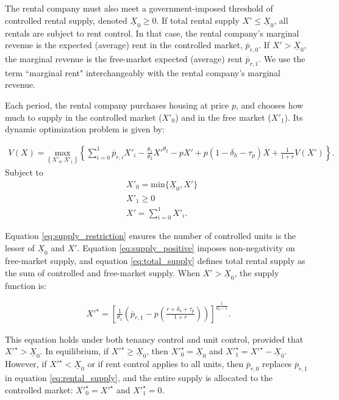 \documentclass[parskip=full]{article}
\begin{document}
The rental company must also meet a government-imposed threshold of controlled rental supply, denoted $\underline{X}_{0} \geq 0$. If total rental supply $X'\le\underline{X}_{0}$, all rentals are subject to rent control. In that case, the rental company's marginal revenue is the expected (average) rent in the controlled market, $\overline{p}_{r,0}$. If $X'>\underline{X}_{0}$, the marginal revenue is the free-market expected (average) rent $\overline{p}_{r,1}$. We use the term ``marginal rent" interchangeably with the rental company's marginal revenue.

Each period, the rental company purchases housing at price $p$, and chooses how much to supply in the controlled market ($X'_{0}$) and in the free market ($X'_{1}$). Its dynamic optimization problem is given by:

\begin{align}\label{eq:rental_company_problem}
V(X)=\underset{\left\{X'_{0},X'_{1}\right\}} {\text{$\mbox{max} $}}\left\{\sum_{i=0}^{1} \overline{p}_{r,i}X'_{i}-\frac{\theta_{1}}{\theta_{2}}X'^{\theta_{2}}-p X'+p(1-\delta_{h}-\tau_{p})X+\frac{1}{1+r}V(X')\right\}.
\end{align}
Subject to
\begin{align}
& X'_{0}=\mbox{min}\{\underline{X}_{0},X'\} \label{eq:supply_restriction} \\
& X'_{1} \geq 0 \label{eq:supply_positive} \\
& X'=\sum^{1}_{i=0} X'_{i}. \label{eq:total_supply} 
\end{align}

\noindent Equation \eqref{eq:supply_restriction} ensures the number of controlled units is the lesser of $\underline{X}_{0}$ and $X'$. Equation \eqref{eq:supply_positive} imposes non-negativity on free-market supply, and equation \eqref{eq:total_supply} defines total rental supply as the sum of controlled and free-market supply. When $X'>\underline{X}_{0}$, the supply function is:

\begin{align}\label{eq:rental_supply}
X'^{\star}=\left[\frac{1}{\theta_{1}}\left(\overline{p}_{r,1}-p\left(\frac{r+\delta_{h}+\tau_{p}}{1+r}\right)\right)\right]^{\frac{1}{\theta_{2}-1}}.
\end{align}

\noindent This equation holds under both tenancy control and unit control, provided that $X'^{\star}>\underline{X}_{0}$. In equilibrium, if $X'^{\star} \geq \underline{X}_{0}$, then $X'^{\star}_{0}=\underline{X}_{0}$ and $X'^{\star}_{1}=X'^{\star}-\underline{X}_{0}$. However, if $X'^{\star} < \underline{X}_{0}$ or if rent control applies to all units, then $\overline{p}_{r,0}$ replaces $\overline{p}_{r,1}$ in equation \eqref{eq:rental_supply}, and the entire supply is allocated to the controlled market: $X'^{\star}_{0}=X'^{\star}$ and $X'^{\star}_{1}=0$.
\end{document}
